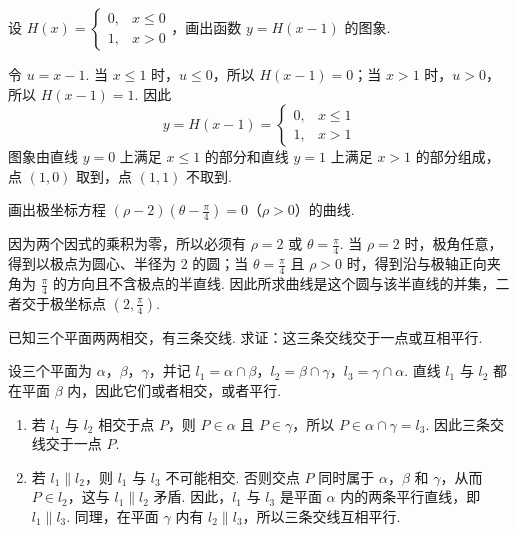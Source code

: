 \documentclass[UTF8,a4paper,oneside,11pt]{ctexbook}
\begin{document}
\begin{problem}

设 \(H(x) = \begin{cases}
0, & x \leqslant 0\\
1, & x > 0
\end{cases}\)，画出函数 \(y = H(x - 1)\) 的图象.
\end{problem}

\begin{solution}
令 \(u=x-1\). 当 \(x\leqslant1\) 时，\(u\leqslant0\)，所以 \(H(x-1)=0\)；当 \(x>1\) 时，\(u>0\)，所以 \(H(x-1)=1\). 因此
\[
y=H(x-1)=\begin{cases}
0,&x\leqslant1\\
1,&x>1
\end{cases}
\]
图象由直线 \(y=0\) 上满足 \(x\leqslant1\) 的部分和直线 \(y=1\) 上满足 \(x>1\) 的部分组成，点 \((1,0)\) 取到，点 \((1,1)\) 不取到.
\end{solution}

\begin{problem}

画出极坐标方程 \((\rho - 2)\left(\theta - \frac{\pi}{4}\right) = 0\)（\(\rho > 0\)）的曲线.
\end{problem}

\begin{solution}
因为两个因式的乘积为零，所以必须有 \(\rho=2\) 或 \(\theta=\frac{\pi}{4}\). 当 \(\rho=2\) 时，极角任意，得到以极点为圆心、半径为 \(2\) 的圆；当 \(\theta=\frac{\pi}{4}\) 且 \(\rho>0\) 时，得到沿与极轴正向夹角为 \(\frac{\pi}{4}\) 的方向且不含极点的半直线. 因此所求曲线是这个圆与该半直线的并集，二者交于极坐标点 \(\left(2,\frac{\pi}{4}\right)\).
\end{solution}

\begin{problem}

已知三个平面两两相交，有三条交线. 求证：这三条交线交于一点或互相平行.
\end{problem}

\begin{solution}
设三个平面为 \(\alpha\)，\(\beta\)，\(\gamma\)，并记 \(l_1=\alpha\cap\beta\)，\(l_2=\beta\cap\gamma\)，\(l_3=\gamma\cap\alpha\). 直线 \(l_1\) 与 \(l_2\) 都在平面 \(\beta\) 内，因此它们或者相交，或者平行.

\begin{enumerate}
\item 若 \(l_1\) 与 \(l_2\) 相交于点 \(P\)，则 \(P\in\alpha\) 且 \(P\in\gamma\)，所以 \(P\in\alpha\cap\gamma=l_3\). 因此三条交线交于一点 \(P\).
\item 若 \(l_1\parallel l_2\)，则 \(l_1\) 与 \(l_3\) 不可能相交. 否则交点 \(P\) 同时属于 \(\alpha\)，\(\beta\) 和 \(\gamma\)，从而 \(P\in l_2\)，这与 \(l_1\parallel l_2\) 矛盾. 因此，\(l_1\) 与 \(l_3\) 是平面 \(\alpha\) 内的两条平行直线，即 \(l_1\parallel l_3\). 同理，在平面 \(\gamma\) 内有 \(l_2\parallel l_3\)，所以三条交线互相平行.
\end{enumerate}
\end{solution}
\end{document}
